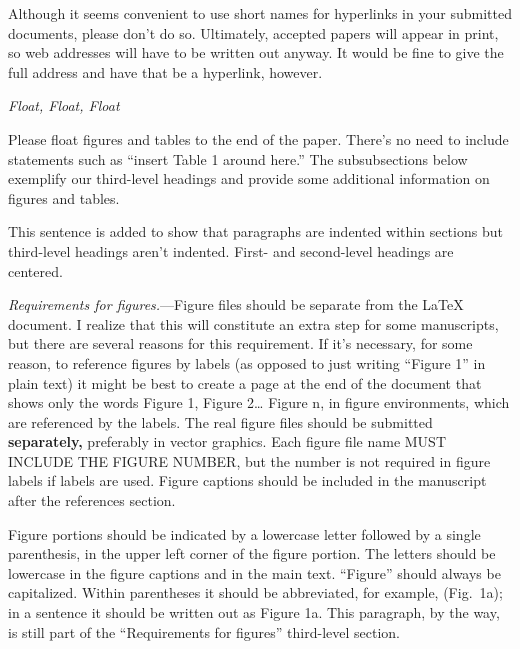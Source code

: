 \documentclass[12pt,letterpaper]{article}
\renewcommand{\subsection}[1]{%
\bigskip
\begin{center}
\begin{large}
\normalfont\itshape #1
\end{large}
\end{center}}
\renewcommand{\subsubsection}[1]{%
\vspace{2ex}
\noindent
\textit{#1.}---}
\begin{document}
Although it seems convenient to use short names for hyperlinks in your submitted
documents, please don't do so. Ultimately, accepted papers
will appear in print, so web addresses will have to be written out
anyway. It would be fine to give the full address and have that be a
hyperlink, however.

\subsection{Float, Float, Float}

Please float figures and tables to the end of the paper. There's no
need to include statements such as ``insert Table 1 around here.'' The subsubsections below exemplify our third-level headings and provide some additional information on figures and tables.

This sentence is added to show that paragraphs are indented
within sections but third-level headings aren't indented. First- and
second-level headings are centered. 
 
\subsubsection{Requirements for figures}Figure files should be
separate from the LaTeX document. I realize that this will constitute
an extra step for some manuscripts, but there are several reasons for
this requirement. If it's necessary, for some reason,
to reference figures by labels (as opposed to just writing
``Figure 1'' in plain text) it might be best to create a page at the
end of the document that shows only the words Figure 1, Figure 2\ldots
Figure n, in figure environments, which are referenced by the
labels. The real figure files should be submitted {\bf separately,} preferably in
vector graphics. Each figure file name MUST INCLUDE THE FIGURE NUMBER, but the number is not required in figure
labels if labels are used. Figure captions should be included in the
manuscript after the references section.

Figure portions should be indicated by a lowercase letter followed by a
single parenthesis, in the upper left corner of the figure
portion. The letters should be lowercase in the figure captions and in
the main text. ``Figure'' should always be capitalized. Within
parentheses it should be abbreviated, for example, (Fig.\ 1a); in a
sentence it should be written out as Figure 1a. This paragraph, by the
way, is still part of the ``Requirements for figures'' third-level section. 
\end{document}
